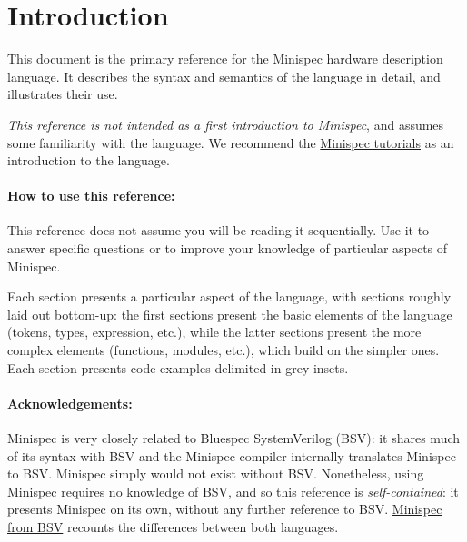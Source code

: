 \section{Introduction}
\label{sec:intro}

This document is the primary reference for the Minispec hardware description language.
It describes the syntax and semantics of the language in detail, and illustrates their use.

\emph{This reference is not intended as a first introduction to Minispec}, and assumes some familiarity with the language.
We recommend the \href{TODO}{Minispec tutorials} as an introduction to the language.

\paragraph{How to use this reference:}
This reference does not assume you will be reading it sequentially.
Use it to answer specific questions or to improve your knowledge of particular aspects of Minispec.

Each section presents a particular aspect of the language, with sections roughly laid out bottom-up:
the first sections present the basic elements of the language (tokens, types, expression, etc.),
while the latter sections present the more complex elements (functions, modules, etc.), which build on the simpler ones.
Each section presents code examples delimited in \colorbox{codebg}{grey insets}.


\paragraph{Acknowledgements:}
Minispec is very closely related to Bluespec SystemVerilog (BSV): it shares much of its syntax with BSV
and the Minispec compiler internally translates Minispec to BSV.
Minispec simply would not exist without BSV.
Nonetheless, using Minispec requires no knowledge of BSV, and so
this reference is \emph{self-contained}: it presents Minispec on its own, without any further reference to BSV.
\href{TODO}{Minispec from BSV} recounts the differences between both languages.

